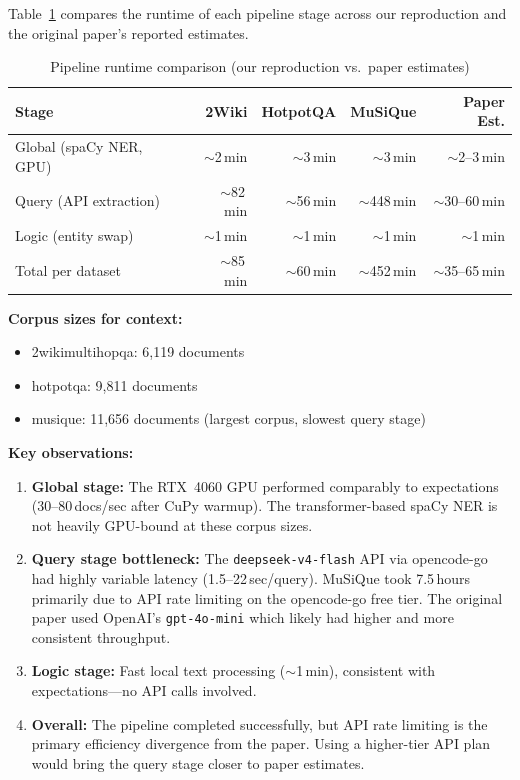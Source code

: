 \documentclass[11pt,a4paper]{article}
\begin{document}
Table~\ref{tab:efficiency} compares the runtime of each pipeline stage across
our reproduction and the original paper's reported estimates.

\begin{table}[H]
\centering
\caption{Pipeline runtime comparison (our reproduction vs.\ paper estimates)}
\label{tab:efficiency}
\begin{tabular}{@{}lrrrr@{}}
\toprule
\textbf{Stage} & \textbf{2Wiki} & \textbf{HotpotQA} & \textbf{MuSiQue} & \textbf{Paper Est.} \\
\midrule
Global (spaCy NER, GPU)  & $\sim$2\,min & $\sim$3\,min & $\sim$3\,min & $\sim$2--3\,min \\
Query (API extraction)   & $\sim$82\,min & $\sim$56\,min & $\sim$448\,min & $\sim$30--60\,min \\
Logic (entity swap)      & $\sim$1\,min & $\sim$1\,min & $\sim$1\,min & $\sim$1\,min \\
\midrule
Total per dataset        & $\sim$85\,min & $\sim$60\,min & $\sim$452\,min & $\sim$35--65\,min \\
\bottomrule
\end{tabular}
\end{table}

\textbf{Corpus sizes for context:}
\begin{itemize}[nosep]
  \item 2wikimultihopqa: 6,119 documents
  \item hotpotqa: 9,811 documents
  \item musique: 11,656 documents (largest corpus, slowest query stage)
\end{itemize}

\textbf{Key observations:}
\begin{enumerate}
  \item \textbf{Global stage:} The RTX~4060 GPU performed comparably to
    expectations (30--80\,docs/sec after CuPy warmup).  The transformer-based
    spaCy NER is not heavily GPU-bound at these corpus sizes.
  \item \textbf{Query stage bottleneck:} The \texttt{deepseek-v4-flash} API
    via opencode-go had highly variable latency (1.5--22\,sec/query).
    MuSiQue took 7.5\,hours primarily due to API rate limiting on the
    opencode-go free tier.  The original paper used OpenAI's
    \texttt{gpt-4o-mini} which likely had higher and more consistent throughput.
  \item \textbf{Logic stage:} Fast local text processing ($\sim$1\,min),
    consistent with expectations---no API calls involved.
  \item \textbf{Overall:} The pipeline completed successfully, but API rate
    limiting is the primary efficiency divergence from the paper.  Using a
    higher-tier API plan would bring the query stage closer to paper estimates.
\end{enumerate}
\end{document}
